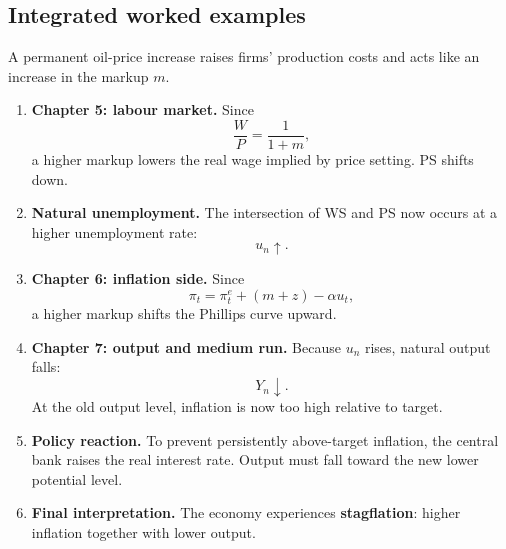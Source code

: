 \documentclass[12pt]{article}
\begin{document}
\subsection{Integrated worked examples}

\begin{examplebox}[title={Worked Example: Permanent oil-price increase across Chapters 5--7}]
A permanent oil-price increase raises firms' production costs and acts like an increase in the markup $m$.

\begin{enumerate}[leftmargin=1.5em]
    \item \textbf{Chapter 5: labour market.}  
    Since
    \[
    \frac{W}{P}=\frac{1}{1+m},
    \]
    a higher markup lowers the real wage implied by price setting. PS shifts down.

    \item \textbf{Natural unemployment.}  
    The intersection of WS and PS now occurs at a higher unemployment rate:
    \[
    u_n\uparrow.
    \]

    \item \textbf{Chapter 6: inflation side.}  
    Since
    \[
    \pi_t=\pi_t^e+(m+z)-\alpha u_t,
    \]
    a higher markup shifts the Phillips curve upward.

    \item \textbf{Chapter 7: output and medium run.}  
    Because $u_n$ rises, natural output falls:
    \[
    Y_n\downarrow.
    \]
    At the old output level, inflation is now too high relative to target.

    \item \textbf{Policy reaction.}  
    To prevent persistently above-target inflation, the central bank raises the real interest rate. Output must fall toward the new lower potential level.

    \item \textbf{Final interpretation.}  
    The economy experiences \textbf{stagflation}: higher inflation together with lower output.
\end{enumerate}
\end{examplebox}
\end{document}
